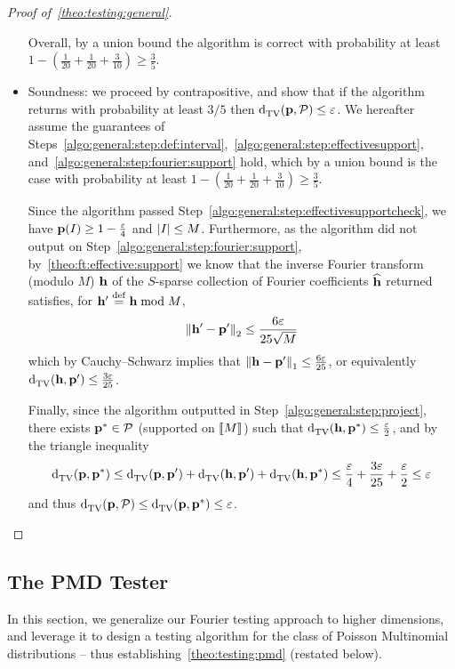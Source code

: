 \begin{proof}[Proof of~\cref{theo:testing:general}]
\begin{itemize}
      Overall, by a union bound the algorithm is correct with probability at least $1-(\frac{1}{20}+\frac{1}{20}+\frac{3}{10}) \geq \frac{3}{5}$.
      
      \item Soundness: we proceed by contrapositive, and show that if the algorithm returns \accept with probability at least $3/5$ then $ {\operatorname{d}_{\rm{TV}}^{}\!\left({\mathbf{p}, \mathcal{P}}\right)} \leq \varepsilon$. 
We hereafter assume the guarantees of Steps~\ref{algo:general:step:def:interval},~\ref{algo:general:step:effectivesupport}, and~\ref{algo:general:step:fourier:support} hold, which by a union bound is the case with probability at least $1-(\frac{1}{20}+\frac{1}{20}+\frac{3}{10}) \geq \frac{3}{5}$.

Since the algorithm passed Step~\ref{algo:general:step:effectivesupportcheck}, we have $\mathbf{p}(I)\geq 1 - \frac{\varepsilon}{4}$ and $\left\lvert I \right\rvert\leq M$. Furthermore, as the algorithm did not output \reject on Step~\ref{algo:general:step:fourier:support}, by~\cref{theo:ft:effective:support} we know that the inverse Fourier transform (modulo $M$) $\mathbf{h}$ of the $S$-sparse collection of Fourier coefficients $\widehat{\mathbf{h}}$ returned satisfies, for $\mathbf{h}'\stackrel{\rm def}{=} \mathbf{h} \bmod M$,
  \[
       {\lVert\mathbf{h}'-\mathbf{p}'{\rVert}}_2 \leq \frac{6\varepsilon}{25\sqrt{M}}
  \]
  which by Cauchy--Schwarz implies that ${\lVert\mathbf{h}-\mathbf{p}'{\rVert}}_1\leq \frac{6\varepsilon}{25}$, or equivalently ${\operatorname{d}_{\rm{TV}}^{}\!\left({\mathbf{h}, \mathbf{p}'}\right)}\leq \frac{3\varepsilon}{25}$.
  
  Finally, since the algorithm outputted \accept in Step~\ref{algo:general:step:project}, there exists $\mathbf{p}^\ast\in\mathcal{P}$ (supported on $\llbracket M\rrbracket$) such that ${\operatorname{d}_{\rm{TV}}^{}\!\left({\mathbf{h}, \mathbf{p}^\ast}\right)}\leq \frac{\varepsilon}{2}$, and by the triangle inequality
  \[
      {\operatorname{d}_{\rm{TV}}^{}\!\left({\mathbf{p}, \mathbf{p}^\ast}\right)} \leq {\operatorname{d}_{\rm{TV}}^{}\!\left({\ensuremath{\mathbf{p}}, \ensuremath{\mathbf{p}}'}\right)} + {\operatorname{d}_{\rm{TV}}^{}\!\left({\mathbf{h}, \mathbf{p}'}\right)} + {\operatorname{d}_{\rm{TV}}^{}\!\left({\mathbf{h}, \mathbf{p}^\ast}\right)} \leq \frac{\varepsilon}{4} + \frac{3\varepsilon}{25} + \frac{\varepsilon}{2} \leq \varepsilon
  \]
  and thus $ {\operatorname{d}_{\rm{TV}}^{}\!\left({\mathbf{p}, \mathcal{P}}\right)} \leq {\operatorname{d}_{\rm{TV}}^{}\!\left({\ensuremath{\mathbf{p}}, \ensuremath{\mathbf{p}}^\ast}\right)} \leq \varepsilon$.
      
  \end{itemize}
\end{proof}

 
\subsection{The PMD Tester}\label{sec:pmd:testing}
In this section, we generalize our Fourier testing approach to higher dimensions, and leverage it to design a testing algorithm for the class of Poisson Multinomial distributions -- thus establishing~\cref{theo:testing:pmd} (restated below).

